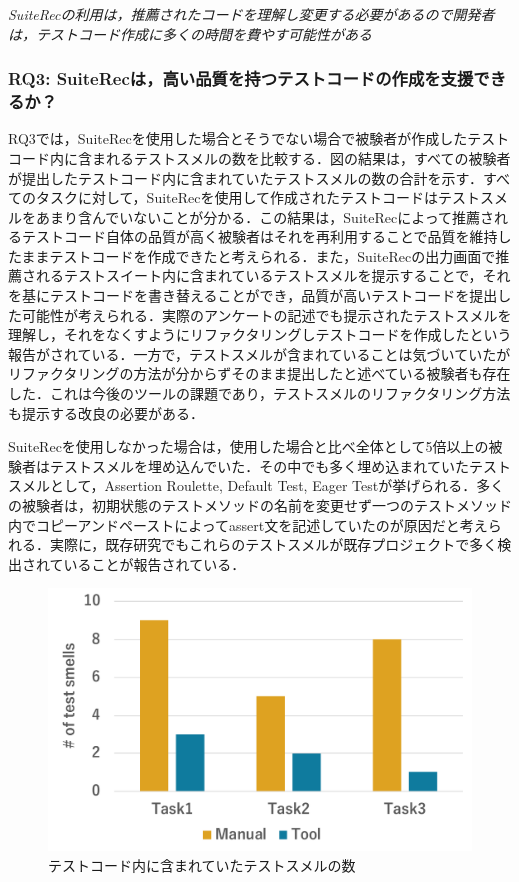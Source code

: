 \documentclass[12pt]{jarticle} %
\begin{document}
\begin{breakbox}
\textit{{\sf SuiteRec}の利用は，推薦されたコードを理解し変更する必要があるので開発者は，テストコード作成に多くの時間を費やす可能性がある}
\end{breakbox}




\subsubsection{RQ3: {\sf SuiteRec}は，高い品質を持つテストコードの作成を支援できるか？}

RQ3では，{\sf SuiteRec}を使用した場合とそうでない場合で被験者が作成したテストコード内に含まれるテストスメルの数を比較する．図の結果は，すべての被験者が提出したテストコード内に含まれていたテストスメルの数の合計を示す．すべてのタスクに対して，{\sf SuiteRec}を使用して作成されたテストコードはテストスメルをあまり含んでいないことが分かる．この結果は，{\sf SuiteRec}によって推薦されるテストコード自体の品質が高く被験者はそれを再利用することで品質を維持したままテストコードを作成できたと考えられる．また，{\sf SuiteRec}の出力画面で推薦されるテストスイート内に含まれているテストスメルを提示することで，それを基にテストコードを書き替えることができ，品質が高いテストコードを提出した可能性が考えられる．実際のアンケートの記述でも提示されたテストスメルを理解し，それをなくすようにリファクタリングしテストコードを作成したという報告がされている．一方で，テストスメルが含まれていることは気づいていたがリファクタリングの方法が分からずそのまま提出したと述べている被験者も存在した．これは今後のツールの課題であり，テストスメルのリファクタリング方法も提示する改良の必要がある．

{\sf SuiteRec}を使用しなかった場合は，使用した場合と比べ全体として5倍以上の被験者はテストスメルを埋め込んでいた．その中でも多く埋め込まれていたテストスメルとして，Assertion Roulette, Default Test, Eager Testが挙げられる．多くの被験者は，初期状態のテストメソッドの名前を変更せず一つのテストメソッド内でコピーアンドペーストによってassert文を記述していたのが原因だと考えられる．実際に，既存研究でもこれらのテストスメルが既存プロジェクトで多く検出されていることが報告されている\cite{b9}．

\begin{figure}[htbp]
  \begin{center}
   \includegraphics[width=12cm]{smells.pdf}
  \caption{テストコード内に含まれていたテストスメルの数}
  \label{smell}
  \end{center}
\end{figure}
\end{document}
